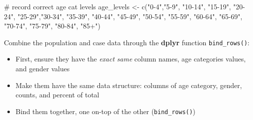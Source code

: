\documentclass[
]{article}
\newenvironment{Shaded}{\begin{snugshade}}{\end{snugshade}}
\newcommand{\CommentTok}[1]{\textcolor[rgb]{0.50,0.62,0.50}{#1}}
\newcommand{\KeywordTok}[1]{\textcolor[rgb]{0.94,0.87,0.69}{#1}}
\newcommand{\NormalTok}[1]{\textcolor[rgb]{0.80,0.80,0.80}{#1}}
\newcommand{\StringTok}[1]{\textcolor[rgb]{0.80,0.58,0.58}{#1}}
\providecommand{\tightlist}{%
  \setlength{\itemsep}{0pt}\setlength{\parskip}{0pt}}
\begin{document}
\begin{Shaded}
\begin{Highlighting}[]
\CommentTok{\# record correct age cat levels}
\NormalTok{age\_levels \textless{}{-}}\StringTok{ }\KeywordTok{c}\NormalTok{(}\StringTok{"0{-}4"}\NormalTok{,}\StringTok{"5{-}9"}\NormalTok{, }\StringTok{"10{-}14"}\NormalTok{, }\StringTok{"15{-}19"}\NormalTok{, }\StringTok{"20{-}24"}\NormalTok{,}
                \StringTok{"25{-}29"}\NormalTok{,}\StringTok{"30{-}34"}\NormalTok{, }\StringTok{"35{-}39"}\NormalTok{, }\StringTok{"40{-}44"}\NormalTok{, }\StringTok{"45{-}49"}\NormalTok{,}
                \StringTok{"50{-}54"}\NormalTok{, }\StringTok{"55{-}59"}\NormalTok{, }\StringTok{"60{-}64"}\NormalTok{, }\StringTok{"65{-}69"}\NormalTok{, }\StringTok{"70{-}74"}\NormalTok{,}
                \StringTok{"75{-}79"}\NormalTok{, }\StringTok{"80{-}84"}\NormalTok{, }\StringTok{"85+"}\NormalTok{)}
\end{Highlighting}
\end{Shaded}

Combine the population and case data through the \textbf{dplyr} function
\texttt{bind\_rows()}:

\begin{itemize}
\tightlist
\item
  First, ensure they have the \emph{exact same} column names, age
  categories values, and gender values\\
\item
  Make them have the same data structure: columns of age category,
  gender, counts, and percent of total\\
\item
  Bind them together, one on-top of the other (\texttt{bind\_rows()})
\end{itemize}
\end{document}

